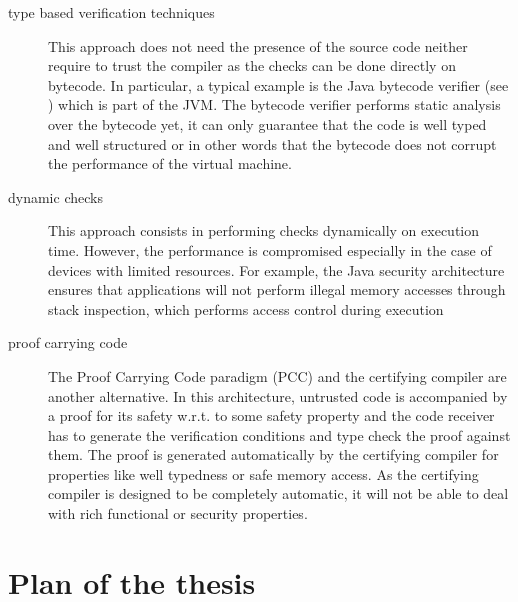\begin{description}
  
  

   \item [type based verification techniques] 
     This approach does not need the presence of the source code neither require to trust the compiler as
     the checks can be done directly on bytecode. In particular, a typical example is the Java bytecode
     verifier (see \cite{Ljbc}) which is part of the JVM. The bytecode verifier performs static analysis over the bytecode yet,
     it can only guarantee that  the code is well typed and well structured or in other words that the
     bytecode does not corrupt the performance of the virtual machine. 

   \item [dynamic checks] This approach consists in performing checks dynamically on execution time.    
     However, the performance is compromised especially in the case of 
     devices with limited resources.  For example,
     the Java security architecture ensures that applications will not
     perform illegal memory accesses through stack inspection, which
     performs access control during execution
   
   \item[proof carrying code]
     The Proof Carrying Code paradigm (PCC) and the certifying compiler \cite{DesNecLee98} are another alternative.
     In this architecture, untrusted code
     is accompanied by a proof for its safety w.r.t. to some safety property and the code receiver has  to generate the 
     verification conditions and type check the proof against them. 
     The proof is generated automatically by the certifying compiler for properties like well typedness or safe memory access. 
     As the certifying compiler is designed to be completely automatic, it will not be able to deal with rich functional or security properties. 
     


\end{description}





\section{Plan of the thesis}


